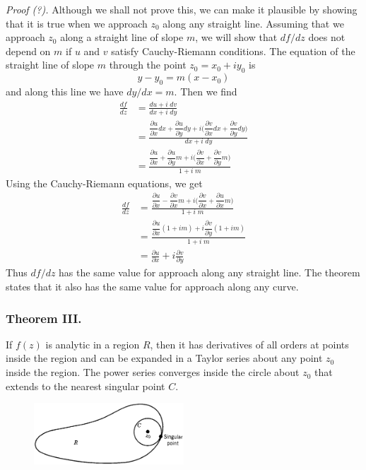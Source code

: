 \documentclass[../../../main.tex]{subfiles}
\begin{document}
\emph{Proof (?).} Although we shall not prove this, we can make it plausible by showing that it is true when we approach $z_0$ along any straight line. Assuming that we approach $z_0$ along a straight line of slope $m$, we will show that $df /dz$ does not depend on $m$ if $u$ and $v$ satisfy Cauchy-Riemann conditions. The equation of the straight line of slope $m$ through the point $z_0 = x_0 + iy_0$ is
\begin{equation*}
    y - y_0 = m(x - x_0)
\end{equation*}
and along this line we have $dy/dx = m$. Then we find
\begin{align*}
    \frac{df}{dz}&=\frac{du+i\;dv}{dx+i\;dy}\\
    &=\frac{\dfrac{\partial u}{\partial x}dx+\dfrac{\partial u}{\partial y}dy+i\biggl(\dfrac{\partial v}{\partial x}dx+\dfrac{\partial v}{\partial y}dy\biggr)}{dx+i\;dy}\\
    &=\frac{\dfrac{\partial u}{\partial x}+\dfrac{\partial u}{\partial y}m+i\biggl(\dfrac{\partial v}{\partial x}+\dfrac{\partial v}{\partial y}m\biggr)}{1+i\;m}
\end{align*}
Using the Cauchy-Riemann equations, we get
\begin{align*}
    \frac{df}{dz}&=\frac{\dfrac{\partial u}{\partial x}-\dfrac{\partial v}{\partial x}m+i\biggl(\dfrac{\partial v}{\partial x}+\dfrac{\partial u}{\partial x}m\biggr)}{1+i\;m}\\
    &=\frac{\dfrac{\partial u}{\partial x}(1+im)+i\dfrac{\partial v}{\partial y}(1+im)}{1+i\;m}\\
    &=\frac{\partial u}{\partial x}+i\frac{\partial v}{\partial y}
\end{align*}
Thus $df /dz$ has the same value for approach along any straight line. The theorem states that it also has the same value for approach along any curve.

\subsubsection{Theorem III.} If $f(z)$ is analytic in a region $R$, then it has derivatives of all orders at points inside the region and can be expanded in a Taylor series about any point $z_0$ inside the region. The power series converges inside the circle about $z_0$ that extends to the nearest singular point $C$.
\begin{figure}[h]
    \centering
    \includegraphics[width=0.5\textwidth]{../../../Rss/AnalyticsApproach/Com/Theorem3.png}
\end{figure}
\end{document}
